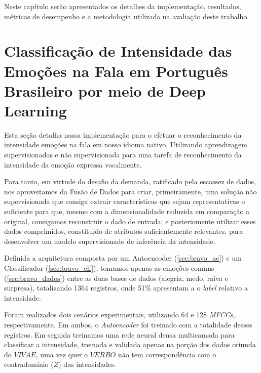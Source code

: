 
Neste capítulo serão apresentados os detalhes da implementação, resultados, métricas de desempenho e a metodologia utilizada na avaliação deste trabalho.\\

\section{Classificação de Intensidade das Emoções na Fala em Português Brasileiro por meio de Deep Learning}\label{sec:implementacao}

Esta seção detalha nossa implementação para o efetuar o reconhecimento da intensidade emoções na fala em nosso idioma nativo. Utilizando aprendizagem supervisionadas e não supervisionada para uma tarefa de reconhecimento da intensidade da emoção expressa vocalmente.

Para tanto, em virtude do desafio da demanda, ratificado pela escassez de dados, nos aproveitamos da Fusão de Dados para criar, primeiramente, uma solução não supervisionada que consiga extrair características que sejam representativas o suficiente para que, mesmo com a dimensionalidade reduzida em comparação a original, consigamos reconstruir o dado de entrada; e posteriomente utilizar esses dados comprimidos, constituído de atributos suficientemente relevantes, para desenvolver um modelo supervisionado de inferência da intensidade.

Definida a arquitetura composta por um Autoencoder (\ref{sec:bravo_ae}) e um Classificador (\ref{sec:bravo_clf}), tomamos apenas as emoções comuns (\ref{sec:bravo_dados}) entre as duas bases de dados (alegria, medo, raiva e surpresa), totalizando 1364 registros, onde 51\% apresentam a o \textit{label} relativo a intensidade. %


Foram realizados dois cenários experimentais, utilizando 64 e 128 \textit{MFCCs}, respectivamente. Em ambos,  o \textit{Autoencoder} foi treinado com a totalidade desses registros. Em seguida treinamos uma rede neural densa multicamada para classificar a intensidade, treinada e validada apenas na porção dos dados oriunda do $VIVAE$, uma vez quer o $VERBO$ não tem correspondência com o contradomínio ($Z$) das intensidades.

